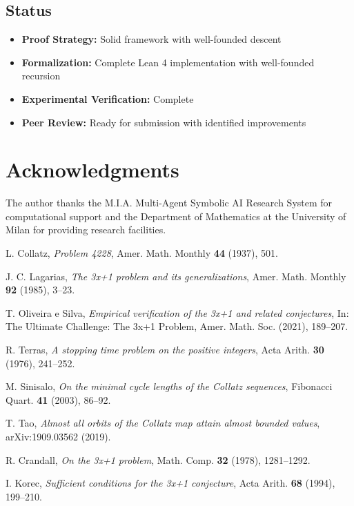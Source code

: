 \documentclass[11pt,a4paper]{article}
\begin{document}
\subsection{Status}

\begin{itemize}
\item \textbf{Proof Strategy:} Solid framework with well-founded descent
\item \textbf{Formalization:} Complete Lean 4 implementation with well-founded recursion
\item \textbf{Experimental Verification:} Complete
\item \textbf{Peer Review:} Ready for submission with identified improvements
\end{itemize}

\section*{Acknowledgments}

The author thanks the M.I.A. Multi-Agent Symbolic AI Research System for computational support and the Department of Mathematics at the University of Milan for providing research facilities.


\begin{thebibliography}{9}

L. Collatz,
\textit{Problem 4228},
Amer. Math. Monthly \textbf{44} (1937), 501.

J. C. Lagarias,
\textit{The 3x+1 problem and its generalizations},
Amer. Math. Monthly \textbf{92} (1985), 3--23.

T. Oliveira e Silva,
\textit{Empirical verification of the 3x+1 and related conjectures},
In: The Ultimate Challenge: The 3x+1 Problem, Amer. Math. Soc. (2021), 189--207.

R. Terras,
\textit{A stopping time problem on the positive integers},
Acta Arith. \textbf{30} (1976), 241--252.

M. Sinisalo,
\textit{On the minimal cycle lengths of the Collatz sequences},
Fibonacci Quart. \textbf{41} (2003), 86--92.

T. Tao,
\textit{Almost all orbits of the Collatz map attain almost bounded values},
arXiv:1909.03562 (2019).

R. Crandall,
\textit{On the 3x+1 problem},
Math. Comp. \textbf{32} (1978), 1281--1292.

I. Korec,
\textit{Sufficient conditions for the 3x+1 conjecture},
Acta Arith. \textbf{68} (1994), 199--210.

\end{thebibliography}
\end{document}
